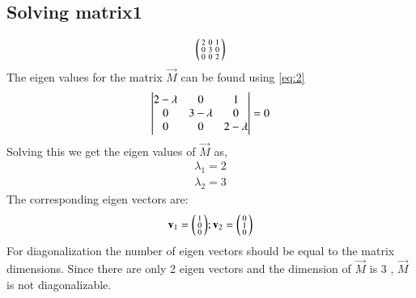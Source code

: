 \documentclass[journal,12pt,twocolumn]{IEEEtran}
\begin{document}
\subsection{Solving matrix1 }
\begin{align}
	\begin{psmallmatrix}2&0&1\\0&3&0\\0 & 0&2\end{psmallmatrix}
\end{align}
The eigen values for the matrix $\vec{M}$ can be found using \eqref{eq:2}
\begin{align}
 \begin{vmatrix}2- \lambda & 0 & 1\\ 0 & 3 -\lambda&0\\0& 0& 2-\lambda\end{vmatrix}=0
\end{align}
Solving this we get the eigen values of $\vec{M}$ as, 
\begin{align}
	\lambda_1 = 2\\
	\lambda_2=  3
\end{align}
The corresponding eigen vectors are:
\begin{align}
	\mathbf v_1 = \begin{psmallmatrix}1\\ 0\\0\end{psmallmatrix};
	\mathbf v_2 = \begin{psmallmatrix}0\\ 1\\0\end{psmallmatrix}
\end{align}
For diagonalization the number of eigen vectors should be equal to the matrix dimensions.
Since there are only 2 eigen vectors and the dimension of $\vec{M}$ is 3 , $\vec{M}$ is not diagonalizable.
\end{document}
